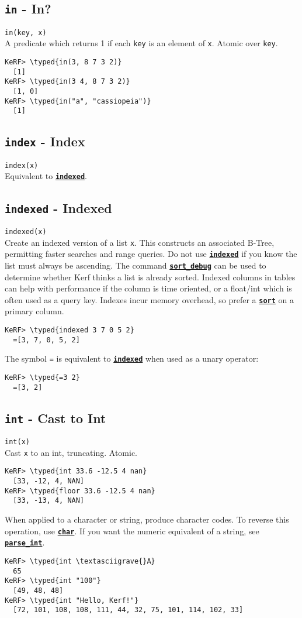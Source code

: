 \documentclass{article}
\newcommand{\typed}[1]{\textcolor{TealBlue}{#1}}
\newcommand{\primdefu}[3]{\subsection{\texttt{#1} - #2}\label{prim:#3}}
\newcommand{\primu}[2]{\hyperref[prim:#2]{\textbf{\texttt{#1}}}}
\newcommand{\primdef}[2]{\primdefu{#1}{#2}{#1}}
\newcommand{\prim}[1]{\primu{#1}{#1}}
\begin{document}
\primdef{in}{In?}
\texttt{in(key, x)}\\

A predicate which returns 1 if each \texttt{key} is an element of \texttt{x}. Atomic over \texttt{key}.
\begin{Verbatim}
KeRF> \typed{in(3, 8 7 3 2)}
  [1]
KeRF> \typed{in(3 4, 8 7 3 2)}
  [1, 0]
KeRF> \typed{in("a", "cassiopeia")}
  [1]
\end{Verbatim}

\primdef{index}{Index}
\texttt{index(x)}\\

Equivalent to \prim{indexed}.

\primdef{indexed}{Indexed}
\texttt{indexed(x)}\\

Create an indexed version of a list \texttt{x}. This constructs an associated B-Tree, permitting faster searches and range queries. Do not use \prim{indexed} if you know the list must always be ascending. The command \primu{sort\_debug}{sortDebug} can be used to determine whether Kerf thinks a list is already sorted.
Indexed columns in tables can help with performance if the column is time oriented, or a float/int which is often used as a query key. Indexes incur memory overhead, so prefer a \prim{sort} on a primary column.

\begin{Verbatim}
KeRF> \typed{indexed 3 7 0 5 2}
  =[3, 7, 0, 5, 2]
\end{Verbatim}

The symbol \texttt{=} is equivalent to \prim{indexed} when used as a unary operator:
\begin{Verbatim}
KeRF> \typed{=3 2}
  =[3, 2]
\end{Verbatim}

\primdef{int}{Cast to Int}
\texttt{int(x)}\\

Cast \texttt{x} to an int, truncating. Atomic.
\begin{Verbatim}
KeRF> \typed{int 33.6 -12.5 4 nan}
  [33, -12, 4, NAN]
KeRF> \typed{floor 33.6 -12.5 4 nan}
  [33, -13, 4, NAN]
\end{Verbatim}

When applied to a character or string, produce character codes. To reverse this operation, use \prim{char}. If you want the numeric equivalent of a string, see \primu{parse\_int}{parseInt}.
\begin{Verbatim}
KeRF> \typed{int \textasciigrave{}A}
  65
KeRF> \typed{int "100"}
  [49, 48, 48]
KeRF> \typed{int "Hello, Kerf!"}
  [72, 101, 108, 108, 111, 44, 32, 75, 101, 114, 102, 33]
\end{Verbatim}
\end{document}
